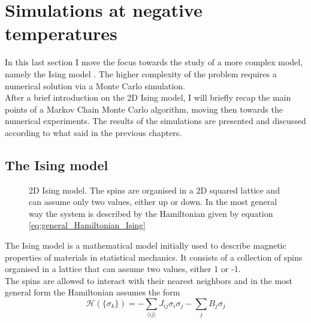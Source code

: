 \chapter{Simulations at negative temperatures}
\label{ch:ising}

In this last section I move the focus towards the study of a more complex model, namely the Ising model \cite{ising}. The higher complexity of the problem requires a numerical solution
via a Monte Carlo simulation. \\
After a brief introduction on the 2D Ising model, I will briefly recap the main points of a Markov Chain Monte Carlo algorithm, moving then towards the numerical experiments. The results of the
simulations are presented and discussed according to what said in the previous chapters. \\
\section{The Ising model}
\begin{figure}[htbp]
    \centering
    \caption{2D Ising model. The spins are organised in a 2D squared lattice and can assume only two values, either up or down. In the most general way the system is described by the Hamiltonian given by equation \ref{eq:general_Hamiltonian_Ising}}
    \label{fig:IsingLattice}
\end{figure}
The Ising model is a mathematical model initially used to describe magnetic properties of materials in statistical mechanics. It consists of a collection of spins 
organised in a lattice that can assume two values, either 1 or -1. \\
The spins are allowed to interact with their nearest neighbors and in the most general form the Hamiltonian assumes the form
\begin{equation}
    \mathcal{H}(\{\sigma_k\}) = -\sum_{\langle i j\rangle} J_{i j} \sigma_{i} \sigma_{j} - \sum_{j} B_j\sigma_{j}
    \label{eq:general_Hamiltonian_Ising}
\end{equation}

